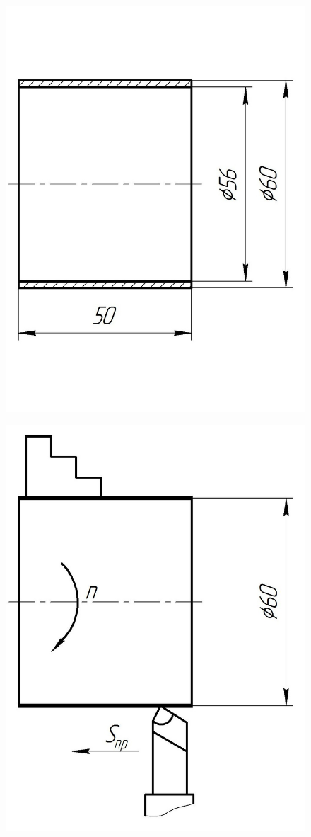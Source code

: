 \documentclass[14pt,oneside,final]{extreport}
\begin{document}
	\begin{figure}[!h]
		\centering
		\begin{minipage}{.5\textwidth}
			\centering
			\includegraphics[width=.65\linewidth]{img/sketch}
			\label{fig:sketch}
		\end{minipage}%
		\begin{minipage}{.5\textwidth}
			\centering
			\includegraphics[width=.65\linewidth]{img/oper-sketch}
			\label{fig:oper-sketch}
		\end{minipage}
	\end{figure}
	
\end{document}
